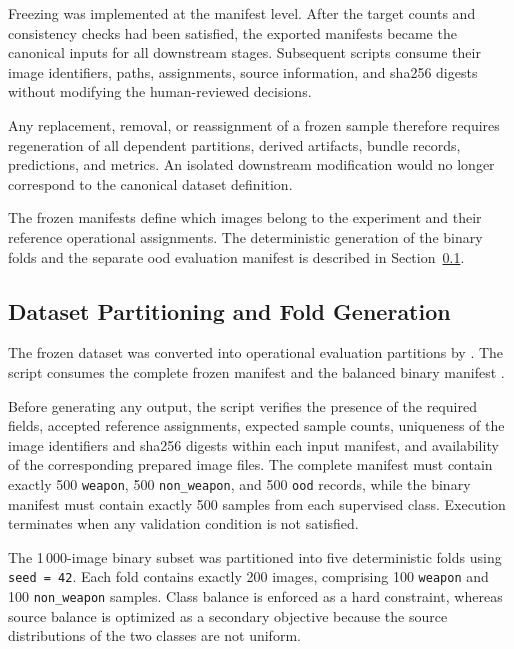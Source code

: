 Freezing was implemented at the manifest level. After the target counts and
consistency checks had been satisfied, the exported manifests became the
canonical inputs for all downstream stages. Subsequent scripts consume their
image identifiers, paths, assignments, source information, and
\gls{sha256} digests without modifying the human-reviewed decisions.

Any replacement, removal, or reassignment of a frozen sample therefore requires
regeneration of all dependent partitions, derived artifacts, bundle records,
predictions, and metrics. An isolated downstream modification would no longer
correspond to the canonical dataset definition.

The frozen manifests define which images belong to the experiment and their
reference operational assignments. The deterministic generation of the binary
folds and the separate \gls{ood} evaluation manifest is described in
Section~\ref{subsec:implementation-split-generation}.


\subsection{Dataset Partitioning and Fold Generation}
\label{subsec:implementation-split-generation}

The frozen dataset was converted into operational evaluation partitions by
. The
script consumes the complete frozen manifest
 and the
balanced binary manifest
.

Before generating any output, the script verifies the presence of the required
fields, accepted reference assignments, expected sample counts, uniqueness of
the image identifiers and \gls{sha256} digests within each input manifest, and
availability of the corresponding prepared image files. The complete manifest
must contain exactly 500 \texttt{weapon}, 500 \texttt{non\_weapon}, and 500
\texttt{ood} records, while the binary manifest must contain exactly 500
samples from each supervised class. Execution terminates when any validation
condition is not satisfied.

The 1\,000-image binary subset was partitioned into five deterministic folds
using \texttt{seed = 42}. Each fold contains exactly 200 images, comprising
100 \texttt{weapon} and 100 \texttt{non\_weapon} samples. Class balance is
enforced as a hard constraint, whereas source balance is optimized as a
secondary objective because the source distributions of the two classes are
not uniform.


